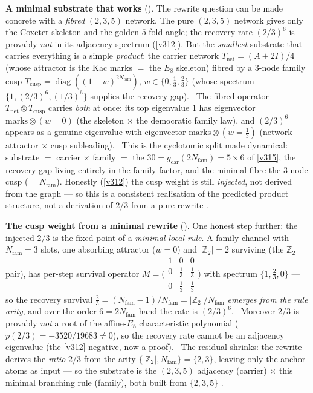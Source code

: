 \documentclass[11pt,a4paper]{article}
\newcommand{\gcar}{g_{\mathrm{car}}}
\newcommand{\Nfam}{N_{\mathrm{fam}}}
\newcommand{\Z}{\mathbb Z}
\begin{document}
\par\smallskip\noindent\textbf{A minimal substrate that works}
(). The rewrite question can be made concrete with a \emph{fibred} $(2,3,5)$
network. The pure $(2,3,5)$ network gives only
the Coxeter skeleton and the golden $5$-fold angle; the recovery rate $(2/3)^6$ is provably \emph{not} in its
adjacency spectrum (\vref{v312}). But the \emph{smallest} substrate that carries everything is a simple
\emph{product}: the carrier network $T_{\mathrm{net}}=(A{+}2I)/4$ (whose attractor is the Kac marks $=$ the $E_8$
skeleton) fibred by a $3$-node family cusp $T_{\mathrm{cusp}}=\operatorname{diag}((1{-}w)^{2\Nfam})$,
$w\in\{0,\tfrac13,\tfrac23\}$ (whose spectrum $\{1,(2/3)^6,(1/3)^6\}$ supplies the recovery gap). \mE\ The fibred
operator $T_{\mathrm{net}}\otimes T_{\mathrm{cusp}}$ carries \emph{both} at once: its top eigenvalue $1$ has
eigenvector $\mathrm{marks}\otimes(w{=}0)$ (the skeleton $\times$ the democratic family law), and $(2/3)^6$ appears
as a genuine eigenvalue with eigenvector $\mathrm{marks}\otimes(w{=}\tfrac13)$ (network attractor $\times$ cusp
subleading). \mE\ This is the cyclotomic split made dynamical: substrate $=$ carrier $\times$ family $=$ the
$30=\gcar(2\Nfam)=5\times6$ of \vref{v315}, the recovery gap living entirely in the family factor, and the minimal
fibre the $3$-node cusp ($=\Nfam$). Honestly (\vref{v312}) the cusp weight is still \emph{injected}, not derived from
the graph --- so this is a consistent realisation of the predicted product structure, not a derivation of $2/3$ from
a pure rewrite \mC.

\par\smallskip\noindent\textbf{The cusp weight from a minimal rewrite}
(). One honest step further: the injected $2/3$ is the fixed point of a
\emph{minimal local rule}. A family channel with $\Nfam{=}3$ slots, one absorbing attractor ($w{=}0$) and
$|\Z_2|{=}2$ surviving (the $\Z_2$ pair), has per-step survival operator
$M=\bigl(\begin{smallmatrix}1&0&0\\0&\frac13&\frac13\\0&\frac13&\frac13\end{smallmatrix}\bigr)$ with spectrum
$\{1,\tfrac23,0\}$ --- so the recovery survival $\tfrac23=(\Nfam{-}1)/\Nfam=|\Z_2|/\Nfam$ \emph{emerges from the
rule arity}, and over the order-$6{=}2\Nfam$ hand the rate is $(2/3)^6$. \mE\ Moreover $2/3$ is provably \emph{not}
a root of the affine-$E_8$ characteristic polynomial ($p(2/3)=-3520/19683\ne0$), so the recovery rate cannot be an
adjacency eigenvalue (the \vref{v312} negative, now a proof). \mO\ The residual shrinks: the rewrite derives the
\emph{ratio} $2/3$ from the arity $\{|\Z_2|,\Nfam\}=\{2,3\}$, leaving only the anchor atoms as input --- so the
substrate is the $(2,3,5)$ adjacency (carrier) $\times$ this minimal branching rule (family), both built from
$\{2,3,5\}$ \mC.
\end{document}
